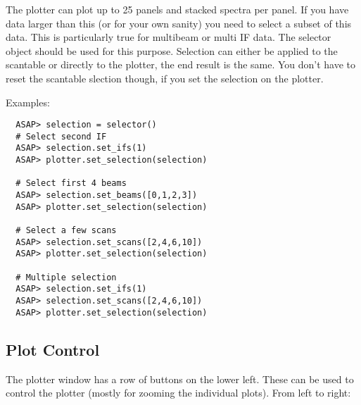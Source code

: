 \documentclass[11pt]{article}
\begin{document}
The plotter can plot up to 25 panels and
stacked spectra per panel. If you have data larger than this (or for
your own sanity) you need to select a subset of this data. This is
particularly true for multibeam or multi IF data. The selector object
should be used for this purpose. Selection can either be applied to
the scantable or directly to the plotter, the end result is the same.
You don't have to reset the scantable slection though, if you set
the selection on the plotter.

Examples:

\begin{verbatim}
  ASAP> selection = selector()
  # Select second IF
  ASAP> selection.set_ifs(1)
  ASAP> plotter.set_selection(selection)

  # Select first 4 beams
  ASAP> selection.set_beams([0,1,2,3])
  ASAP> plotter.set_selection(selection)

  # Select a few scans
  ASAP> selection.set_scans([2,4,6,10])
  ASAP> plotter.set_selection(selection)

  # Multiple selection
  ASAP> selection.set_ifs(1)
  ASAP> selection.set_scans([2,4,6,10])
  ASAP> plotter.set_selection(selection)

\end{verbatim}

\subsection{Plot Control}

The plotter window has a row of buttons on the
lower left. These can be used to control the plotter (mostly for
zooming the individual plots). From left to right:
\end{document}
